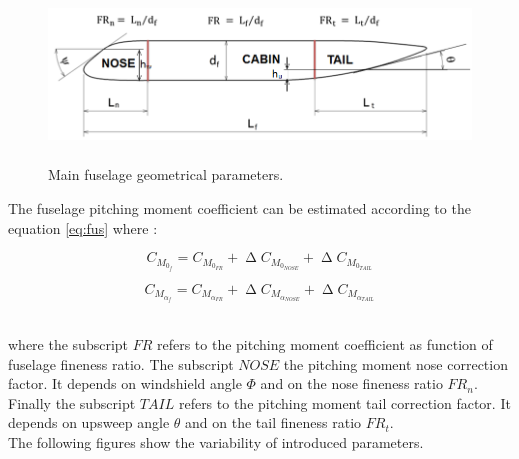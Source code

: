 \begin{figure}[H]
\centering
\includegraphics[height=4.6cm]{Immagini/fuselage}
\caption{Main fuselage geometrical parameters.}
\label{fusgeometry}
\end{figure}


The fuselage pitching moment coefficient can be estimated according to the equation \ref{eq:fus} where :

\begin{equation}
C_{M_{0_f}} = C_{M_{0_{FR}}} + \upDelta C_{M_{0_{NOSE}}} +  \upDelta C_{M_{0_{TAIL}}}
\end{equation}

\begin{equation}
C_{M_{{\alpha}_f}} = C_{M_{{\alpha}_{FR}}} + \upDelta C_{M_{{\alpha}_{NOSE}}} +  \upDelta C_{M_{{\alpha}_{TAIL}}}
\end{equation}

\noindent \\

where the subscript $FR$ refers to the pitching moment coefficient as function of fuselage fineness ratio. The subscript $NOSE$ the pitching moment nose correction factor. It depends on windshield angle $\Phi$ and on the nose fineness ratio $FR_n$. Finally the subscript $TAIL$ refers to the pitching moment tail correction factor. It depends on upsweep angle $\theta$ and on the tail fineness ratio $FR_t$.\\
The following figures show the variability of introduced parameters.

